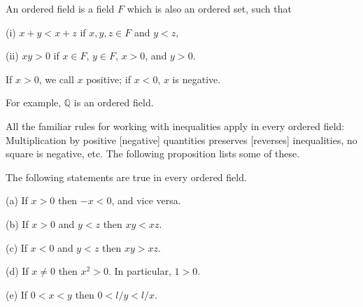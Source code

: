 \begin{myDefinition}\label{myDefinition:1.17}
    An ordered field is a field $F$ which is also an ordered set, such
    that
    
    (i) $x+y<x+z$ if $x,y,z\in F$ and $y<z$,
    
    (ii) $xy>0$ if $x\in F$, $y\in F$, $x>0$, and $y>0$.
\end{myDefinition}
If $x > 0$, we call $x$ positive; 
if $x < 0$, $x$ is negative.

For example, $\mathbb{Q}$ is an ordered field.

All the familiar rules for working with inequalities apply in every ordered
field: Multiplication by positive [negative] quantities preserves [reverses] inequalities, no square is negative, etc. The following proposition lists some of
these.


\begin{myProposition}\label{myProposition:1.18}
    The following statements are true in every ordered field.

(a) If $x>0$ then $-x <0$, and vice versa.

(b) If $x>0$ and $y<z$ then $xy <xz$.

(c) If $x<0$ and $y<z$ then $xy> xz$.

(d) If $x \neq 0$ then $x^2 > 0$. In particular, $1 > 0$.

(e) If $0<x<y$ then $0<l/y<l/x$.
\end{myProposition}

